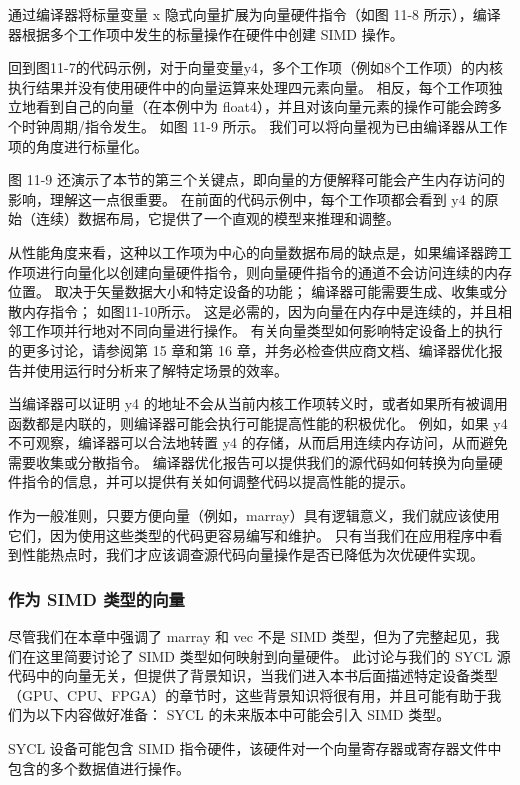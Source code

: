 通过编译器将标量变量 x 隐式向量扩展为向量硬件指令（如图 11-8 所示），编译器根据多个工作项中发生的标量操作在硬件中创建 SIMD 操作。

回到图11-7的代码示例，对于向量变量y4，多个工作项（例如8个工作项）的内核执行结果并没有使用硬件中的向量运算来处理四元素向量。 相反，每个工作项独立地看到自己的向量（在本例中为 float4），并且对该向量元素的操作可能会跨多个时钟周期/指令发生。 如图 11-9 所示。 我们可以将向量视为已由编译器从工作项的角度进行标量化。

图 11-9 还演示了本节的第三个关键点，即向量的方便解释可能会产生内存访问的影响，理解这一点很重要。 在前面的代码示例中，每个工作项都会看到 y4 的原始（连续）数据布局，它提供了一个直观的模型来推理和调整。

从性能角度来看，这种以工作项为中心的向量数据布局的缺点是，如果编译器跨工作项进行向量化以创建向量硬件指令，则向量硬件指令的通道不会访问连续的内存位置。 取决于矢量数据大小和特定设备的功能； 编译器可能需要生成、收集或分散内存指令； 如图11-10所示。 这是必需的，因为向量在内存中是连续的，并且相邻工作项并行地对不同向量进行操作。 有关向量类型如何影响特定设备上的执行的更多讨论，请参阅第 15 章和第 16 章，并务必检查供应商文档、编译器优化报告并使用运行时分析来了解特定场景的效率。

当编译器可以证明 y4 的地址不会从当前内核工作项转义时，或者如果所有被调用函数都是内联的，则编译器可能会执行可能提高性能的积极优化。 例如，如果 y4 不可观察，编译器可以合法地转置 y4 的存储，从而启用连续内存访问，从而避免需要收集或分散指令。 编译器优化报告可以提供我们的源代码如何转换为向量硬件指令的信息，并可以提供有关如何调整代码以提高性能的提示。

作为一般准则，只要方便向量（例如，marray）具有逻辑意义，我们就应该使用它们，因为使用这些类型的代码更容易编写和维护。 只有当我们在应用程序中看到性能热点时，我们才应该调查源代码向量操作是否已降低为次优硬件实现。

\subsubsection{作为 SIMD 类型的向量}
尽管我们在本章中强调了 marray 和 vec 不是 SIMD 类型，但为了完整起见，我们在这里简要讨论了 SIMD 类型如何映射到向量硬件。 此讨论与我们的 SYCL 源代码中的向量无关，但提供了背景知识，当我们进入本书后面描述特定设备类型（GPU、CPU、FPGA）的章节时，这些背景知识将很有用，并且可能有助于我们为以下内容做好准备： SYCL 的未来版本中可能会引入 SIMD 类型。

SYCL 设备可能包含 SIMD 指令硬件，该硬件对一个向量寄存器或寄存器文件中包含的多个数据值进行操作。

